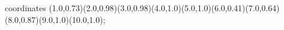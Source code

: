 					coordinates { (1.0,0.73)(2.0,0.98)(3.0,0.98)(4.0,1.0)(5.0,1.0)(6.0,0.41)(7.0,0.64)(8.0,0.87)(9.0,1.0)(10.0,1.0)};
